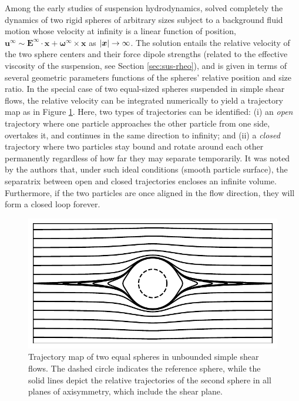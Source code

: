 Among the early studies of suspension hydrodynamics, \cite{batchelor_green_1972} solved completely the dynamics of two rigid spheres of arbitrary sizes subject to a background fluid motion whose velocity at infinity is a linear function of position, \ie
${\bm u}^\infty \sim {\bm E}^\infty \cdot {\bm x} + {\bm \omega}^\infty \times {\bm x}$ as $\lvert{\bm x}\rvert \to \infty$.
The solution entails the relative velocity of the two sphere centers and their force dipole strengths (related to the effective viscosity of the suspension, see Section \ref{sec:sus-rheo}), and is given in terms of several geometric parameters functions of the spheres' relative position and size ratio.
In the special case of two equal-sized spheres suspended in simple shear flows, the relative velocity can be integrated numerically to yield a trajectory map as in Figure \ref{fig:BG-traj}.
Here, two types of trajectories can be identified:
(i) an \emph{open} trajectory where one particle approaches the other particle from one side, overtakes it, and continues in the same direction to infinity; and
(ii) a \emph{closed} trajectory where two particles stay bound and rotate around each other permanently regardless of how far they may separate temporarily.
It was noted by the authors that, under such ideal conditions (\eg smooth particle surface), the separatrix between open and closed trajectories encloses an infinite volume.
Furthermore, if the two particles are once aligned in the flow direction, they will form a closed loop forever.

\begin{figure}%
  \centering
  \includegraphics[width=0.8\columnwidth]{BG-traj4.pdf}
  \caption{Trajectory map of two equal spheres in unbounded simple shear flows. The dashed circle indicates the reference sphere, while the solid lines depict the relative trajectories of the second sphere in all planes of axisymmetry, which include the shear plane.}
  \label{fig:BG-traj}
\end{figure}

